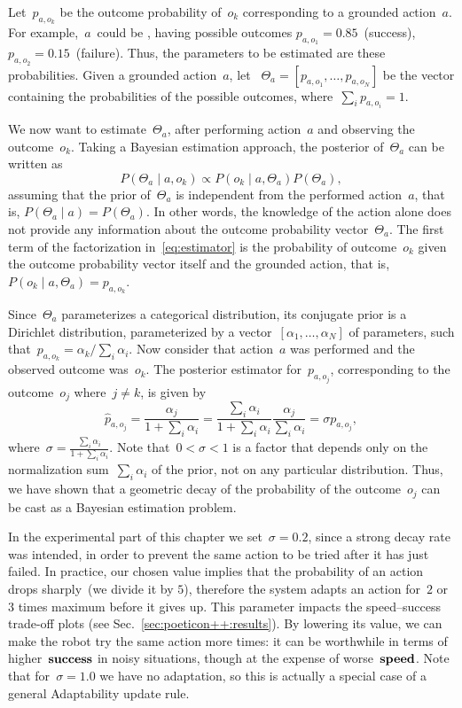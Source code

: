 Let~$p_{a,o_k}$ be the outcome probability of~$o_k$ corresponding to a grounded action~$a$. For example,~$a$~could be , having possible outcomes $p_{a,o_1}=0.85$~(success), $p_{a,o_2}=0.15$~(failure). Thus, the parameters to be estimated are these probabilities. Given a grounded action~$a$, let~ $\Theta_a=[p_{a,o_1}, \ldots, p_{a,o_N}]$ be the vector containing the probabilities of the possible outcomes, where~$\sum_i p_{a,o_i} = 1$.

We now want to estimate~$\Theta_a$, after performing action~$a$ and observing the outcome~$o_k$.
Taking a Bayesian estimation approach, the posterior of~$\Theta_a$ can be written as
\begin{equation}
  \label{eq:estimator}
  P(\Theta_a \mid a, o_k) \propto P(o_k \mid a, \Theta_a) P(\Theta_a),
\end{equation}
assuming that the prior of~$\Theta_a$ is independent from the performed action~$a$, that is, $P(\Theta_a \mid a)=P(\Theta_a)$. In other words,
the knowledge of the action alone does not provide any information about the outcome probability vector~$\Theta_a$.
The first term of the factorization in~\eqref{eq:estimator} is the probability of outcome~$o_k$ given the outcome probability vector itself and the grounded action, that is, $P(o_k \mid a, \Theta_a)=p_{a,o_k}$.

Since~$\Theta_a$ parameterizes a categorical distribution, its conjugate prior is a Dirichlet distribution, parameterized by a vector~$[\alpha_1,\ldots, \alpha_N]$ of parameters, such that~$p_{a,o_k} = \alpha_k / \sum_i \alpha_i$. Now consider that action~$a$ was performed and the observed outcome was~$o_k$.
The posterior estimator for~$p_{a,o_j}$, corresponding to the outcome~$o_j$ where~$j\neq k$, is given by
\begin{equation}
  \label{eq:decay}
  \hat{p}_{a,o_j} = \frac{\alpha_j}{1+\sum_i \alpha_i}
  = \frac{\sum_i \alpha_i}{1+\sum_i \alpha_i} \frac{\alpha_j}{\sum_i \alpha_i}
  = \sigma p_{a,o_j},
\end{equation}
where~$\sigma=\frac{\sum_i \alpha_i}{1+\sum_i \alpha_i}$. Note that~$0<\sigma<1$ is a factor that depends only on the normalization sum~$\sum_i \alpha_i$ of the prior, not on any particular distribution. Thus, we have shown that a geometric decay of the probability of the outcome~$o_j$ can be cast as a Bayesian estimation problem.

In the experimental part of this chapter we set~$\sigma = 0.2$, since a strong decay rate was intended, in order to prevent the same action to be tried after it has just failed.
In practice, our chosen value implies that the probability of an action drops sharply~(we divide it by $5$), therefore the system adapts an action for~$2$ or~$3$ times maximum before it gives up.
This parameter impacts the speed--success trade-off plots (see Sec.~\ref{sec:poeticon++:results}).
By lowering its value, we can make the robot try the same action more times: it can be worthwhile in terms of higher~$\textbf{\ensuremath{\text{success}}}$ in noisy situations, though at the expense of worse~$\textbf{\ensuremath{\text{speed}}}$.
Note that for~$\sigma = 1.0$ we have no adaptation, so this is actually a special case of a general Adaptability update rule.

